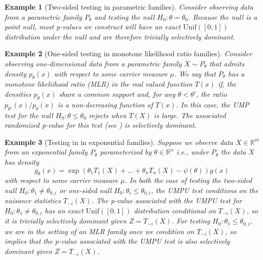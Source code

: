 \documentclass{article}
\newtheorem{example}{Example}
\newcommand{\R}{\mathbb{R}}
\begin{document}
\begin{example}[Two-sided testing in parametric families]
\label{exm:two-sided}
Consider observing data from a parametric family $P_{\theta}$ and testing the null $H_0 : \theta = \theta_0$. Because the null is a point null, most p-values we construct will have an exact $\text{Unif}([0, 1])$ distribution under the null and are therefore trivially selectively dominant. 
\end{example}

\begin{example}[One-sided testing in monotone likelihood ratio families]
\label{exm:mlr}
Consider observing one-dimensional data from a parametric family $X \sim P_{\theta}$ that admits density $p_{\theta}(x)$ with respect to some carrier measure $\mu$. We say that $P_{\theta}$ has a monotone likeliihood ratio (MLR) in the real valued function $T(x)$ if, the densities $p_{\theta}(x)$ share a common support and, for any $\theta < \theta'$, the ratio $p_{\theta'}(x)/p_{\theta}(x)$ is a non-decreasing function of $T(x)$. In this case, the UMP test for the null $H_0: \theta \leq \theta_0$ rejects when $T(X)$ is large. The associated randomized p-value for this test (see ) is selectively dominant. 
\end{example}

\begin{example}[Testing in in exponential families]
\label{exm:exp_fam}
Suppose we observe data $X \in \R^m$ from an exponential family $P_{\theta}$ parameterized by $\theta \in \R^n$ i.e., under $P_{\theta}$ the data $X$ has density  
\begin{equation*}
    g_{\theta}(x) = \exp( \theta_1 T_1(X) + \dots + \theta_n T_n(X) - \psi(\theta) ) g(x) 
\end{equation*}
with respect to some carrier measure $\mu$. In both the case of testing the two-sided null $H_0: \theta_1 \neq \theta_{0, i}$ or one-sided null $H_0: \theta_i \leq \theta_{0, i}$, the UMPU test conditions on the nuisance statistics $T_{-i}(X)$. The p-value associated with the UMPU test for $H_0: \theta_1 \neq \theta_{0, i}$ has an exact $\text{Unif}([0, 1])$ distribution conditional on $T_{-i}(X)$, so it is trivially selectively dominant given $Z = T_{-i}(X)$. For testing $H_0: \theta_1 \leq \theta_{0, i}$, we are in the setting of an MLR family once we condition on $T_{-i}(X)$, so  implies that the p-value associated with the UMPU test is also selectively dominant given $Z = T_{-i}(X)$.
\end{example}
\end{document}
